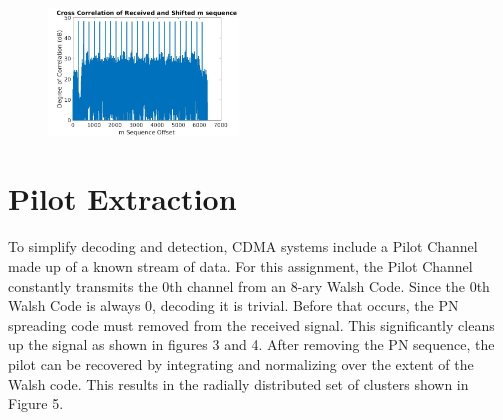 \documentclass[twocolumn]{article}
\begin{document}
\begin{figure}[h]
    \centering
    \includegraphics[width=0.45\textwidth]{newpn.jpg}
    \caption{}
    \label{fig}
\end{figure}

\section{Pilot Extraction}

To simplify decoding and detection, CDMA systems include a Pilot Channel made up of a known stream of data. For this assignment, the Pilot Channel constantly transmits the 0th channel from an 8-ary Walsh Code. Since the 0th Walsh Code is always 0, decoding it is trivial. Before that occurs, the PN spreading code must removed from the received signal. This significantly cleans up the signal as shown in figures 3 and 4. After removing the PN sequence, the pilot can be recovered by integrating and normalizing over the extent of the Walsh code. This results in the radially distributed set of clusters shown in Figure 5. 
\end{document}
